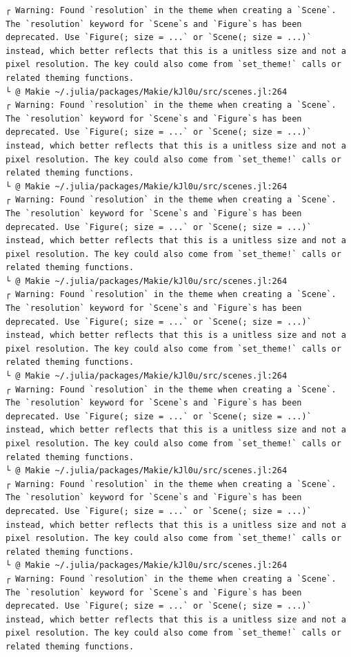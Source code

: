 \documentclass[
  12pt,
  a4paper,
  DIV=11,
  numbers=noendperiod]{scrreprt}
\begin{document}
\begin{verbatim}
┌ Warning: Found `resolution` in the theme when creating a `Scene`. The `resolution` keyword for `Scene`s and `Figure`s has been deprecated. Use `Figure(; size = ...` or `Scene(; size = ...)` instead, which better reflects that this is a unitless size and not a pixel resolution. The key could also come from `set_theme!` calls or related theming functions.
└ @ Makie ~/.julia/packages/Makie/kJl0u/src/scenes.jl:264
┌ Warning: Found `resolution` in the theme when creating a `Scene`. The `resolution` keyword for `Scene`s and `Figure`s has been deprecated. Use `Figure(; size = ...` or `Scene(; size = ...)` instead, which better reflects that this is a unitless size and not a pixel resolution. The key could also come from `set_theme!` calls or related theming functions.
└ @ Makie ~/.julia/packages/Makie/kJl0u/src/scenes.jl:264
┌ Warning: Found `resolution` in the theme when creating a `Scene`. The `resolution` keyword for `Scene`s and `Figure`s has been deprecated. Use `Figure(; size = ...` or `Scene(; size = ...)` instead, which better reflects that this is a unitless size and not a pixel resolution. The key could also come from `set_theme!` calls or related theming functions.
└ @ Makie ~/.julia/packages/Makie/kJl0u/src/scenes.jl:264
┌ Warning: Found `resolution` in the theme when creating a `Scene`. The `resolution` keyword for `Scene`s and `Figure`s has been deprecated. Use `Figure(; size = ...` or `Scene(; size = ...)` instead, which better reflects that this is a unitless size and not a pixel resolution. The key could also come from `set_theme!` calls or related theming functions.
└ @ Makie ~/.julia/packages/Makie/kJl0u/src/scenes.jl:264
┌ Warning: Found `resolution` in the theme when creating a `Scene`. The `resolution` keyword for `Scene`s and `Figure`s has been deprecated. Use `Figure(; size = ...` or `Scene(; size = ...)` instead, which better reflects that this is a unitless size and not a pixel resolution. The key could also come from `set_theme!` calls or related theming functions.
└ @ Makie ~/.julia/packages/Makie/kJl0u/src/scenes.jl:264
┌ Warning: Found `resolution` in the theme when creating a `Scene`. The `resolution` keyword for `Scene`s and `Figure`s has been deprecated. Use `Figure(; size = ...` or `Scene(; size = ...)` instead, which better reflects that this is a unitless size and not a pixel resolution. The key could also come from `set_theme!` calls or related theming functions.
└ @ Makie ~/.julia/packages/Makie/kJl0u/src/scenes.jl:264
┌ Warning: Found `resolution` in the theme when creating a `Scene`. The `resolution` keyword for `Scene`s and `Figure`s has been deprecated. Use `Figure(; size = ...` or `Scene(; size = ...)` instead, which better reflects that this is a unitless size and not a pixel resolution. The key could also come from `set_theme!` calls or related theming functions.

\end{verbatim}
\end{document}
